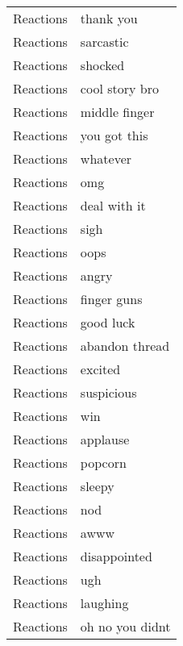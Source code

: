 \begin{supertabular}{l p{0.25\textwidth}}
        Reactions &                          thank you \\
        Reactions &                          sarcastic \\
        Reactions &                            shocked \\
        Reactions &                     cool story bro \\
        Reactions &                      middle finger \\
        Reactions &                       you got this \\
        Reactions &                           whatever \\
        Reactions &                                omg \\
        Reactions &                       deal with it \\
        Reactions &                               sigh \\
        Reactions &                               oops \\
        Reactions &                              angry \\
        Reactions &                        finger guns \\
        Reactions &                          good luck \\
        Reactions &                     abandon thread \\
        Reactions &                            excited \\
        Reactions &                         suspicious \\
        Reactions &                                win \\
        Reactions &                           applause \\
        Reactions &                            popcorn \\
        Reactions &                             sleepy \\
        Reactions &                                nod \\
        Reactions &                               awww \\
        Reactions &                       disappointed \\
        Reactions &                                ugh \\
        Reactions &                           laughing \\
        Reactions &                    oh no you didnt \\

\end{supertabular}
